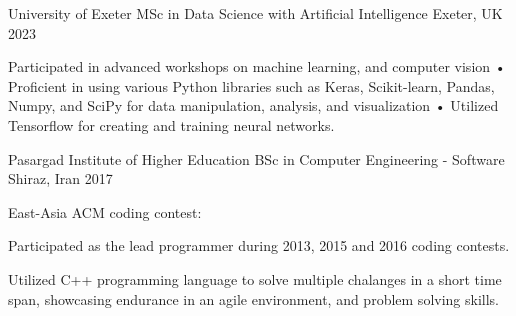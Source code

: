 \begin{cventries}

  \cventry
    {University of Exeter} %
    {MSc in Data Science with Artificial Intelligence} %
    {Exeter, UK} %
    {2023} %
    {
      \begin{cvitems} %
        \item {Participated in advanced workshops on machine learning, and computer vision • Proficient in using various Python libraries such as Keras, Scikit-learn, Pandas, Numpy, and SciPy for data manipulation, analysis, and visualization • Utilized Tensorflow for creating and training neural networks.}
      \end{cvitems}
    }
  \cventry
    {Pasargad Institute of Higher Education} %
    {BSc in Computer Engineering - Software} %
    {Shiraz, Iran} %
    {2017} %
    {
      \begin{cvitems} %
        \item {East-Asia ACM coding contest:}
        \vspace{4mm}  
        \begin{cvitems}
            \item{Participated as the lead programmer during 2013, 2015 and 2016 coding contests.}
            \item{Utilized C++ programming language to solve multiple chalanges in a short time span, showcasing endurance in an agile environment, and problem solving skills.}
          \end{cvitems}
      \end{cvitems}
    }
\end{cventries}
